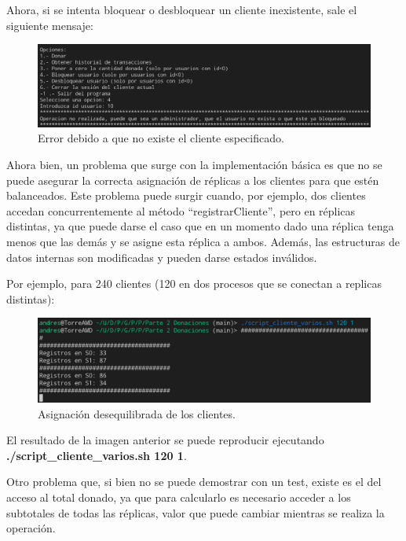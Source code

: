\documentclass{article}
\begin{document}
Ahora, si se intenta bloquear o desbloquear un cliente inexistente, sale el siguiente mensaje:
\begin{figure}[H]
    \centering
    \includegraphics[width=\textwidth]{imagenes/bloqueo/6.png}
    \caption{Error debido a que no existe el cliente especificado.}
\end{figure}


Ahora bien, un problema que surge con la implementación básica es que no se puede asegurar la correcta asignación de réplicas a los clientes para que estén balanceados. Este problema puede surgir cuando, por ejemplo, dos clientes accedan concurrentemente al método ``registrarCliente'', pero en réplicas distintas, ya que puede darse el caso que en un momento dado una réplica tenga menos que las demás y se asigne esta réplica a ambos. Además, las estructuras de datos internas son modificadas y pueden darse estados inválidos.

Por ejemplo, para 240 clientes (120 en dos procesos que se conectan a replicas distintas):
\begin{figure}[H]
    \centering
    \includegraphics[width=\textwidth]{imagenes/varios/incorrecto.png}
    \caption{Asignación desequilibrada de los clientes.}
\end{figure}

El resultado de la imagen anterior se puede reproducir ejecutando \textbf{./script\_cliente\_varios.sh 120 1}.

Otro problema que, si bien no se puede demostrar con un test, existe es el del acceso al total donado, ya que para calcularlo es necesario acceder a los subtotales de todas las réplicas, valor que puede cambiar mientras se realiza la operación.
\end{document}
